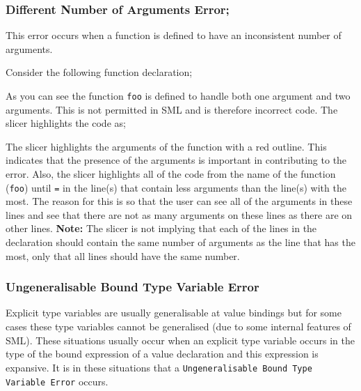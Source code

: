 \documentclass{report}
\begin{document}
\begin{itemize}
\newpage

\subsubsection{Different Number of Arguments Error;}

\subitem This error occurs when a function is defined to have an
inconsistent number of arguments.

Consider the following function declaration;


As you can see the function \texttt{foo} is defined to handle
both one argument and two arguments. This is not permitted in SML and
is therefore incorrect code. The slicer highlights the code as;

The slicer highlights the arguments of the function with a red
outline. This indicates that the presence of the arguments is
important in contributing to the error. Also, the slicer highlights
all of the code from the name of the function (\texttt{foo})
until \texttt{=} in the line(s) that contain less arguments
than the line(s) with the most. The reason for this is so that the
user can see all of the arguments in these lines and see that there
are not as many arguments on these lines as there are on other lines.
\textbf{Note:} The slicer is not implying that each of the lines in
the declaration should contain the same number of arguments as the
line that has the most, only that all lines should have the same number.


\subsubsection{Ungeneralisable Bound Type Variable Error}

\subitem Explicit type variables are usually generalisable at value
bindings but for some cases these type variables cannot be generalised
(due to some internal features of SML). These situations usually occur
when an explicit type variable occurs in the type of the bound
expression of a value declaration and this expression is expansive. It is
in these situations that a \texttt{Ungeneralisable Bound Type
  Variable Error} occurs.


\end{itemize}
\end{document}
